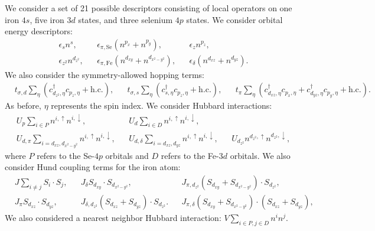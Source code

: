 We consider a set of 21 possible descriptors consisting of local operators on one iron $4s$, five iron $3d$ states, and three selenium $4p$ states.
We consider orbital energy descriptors: 
\begin{align*}
  &\epsilon_{s} n^s,&
  &\epsilon_{\pi,\mathrm{Se}} (n^{p_x} + n^{p_y}), &
  &\epsilon_{z} n^{p_z},&
  \\
  &\epsilon_{z^2} n^{d_{z^2}},& 
  &\epsilon_{\pi,\mathrm{Fe}} (n^{d_{xy}} + n^{d_{x^2-y^2}}),&
  &\epsilon_{\delta} (n^{d_{xz}} + n^{d_{yz}}).& 
\end{align*}
We also consider the symmetry-allowed hopping terms:
\begin{align*}
  &t_{\sigma,d} \sum_{\eta} \left( c_{d_{z^2},\eta}^{\dagger} c_{p_z,\eta} + \text{h.c.} \right),&
  &t_{\sigma,s} \sum_{\eta} \left(c_{s,\eta}^{\dagger}  c_{p_z,\eta} + \text{h.c.} \right),&
  &t_{\pi} \sum_{\eta} \left(c_{d_{xz},\eta}^{\dagger}  c_{p_x,\eta} + c_{d_{yz},\eta}^{\dagger}  c_{p_y,\eta} + \text{h.c.} \right).&
\end{align*}
As before, $\eta$ represents the spin index.
We consider Hubbard interactions:
\begin{align*}
  &U_p \sum_{i \in P} n^{i,\uparrow} n^{i,\downarrow},&
  &U_d \sum_{i \in D} n^{i,\uparrow} n^{i,\downarrow},&
  \\
  &U_{d,\pi} \sum_{i=d_{xz},d_{x^2-y^2}} n^{i,\uparrow} n^{i,\downarrow},&
  &U_{d,\delta} \sum_{i=d_{xz},d_{yz}} n^{i,\uparrow} n^{i,\downarrow},&
  &U_{d_{z^2}} n^{d_{z^2},\uparrow} n^{d_{z^2},\downarrow},&
\end{align*}
where $P$ refers to the Se-$4p$ orbitals and $D$ refers to the Fe-$3d$ orbitals. 
We also consider Hund coupling terms for the iron atom:
\begin{align*}
  &J \sum_{i\ne j} S_i \cdot S_j,&
  &J_{\delta} S_{d_{xy}} \cdot S_{d_{x^2-y^2}},&
  &J_{\pi,d_{z^2}} (S_{d_{xy}} + S_{d_{x^2-y^2}}) \cdot S_{d_{z^2}},&
  \\
  &J_{\pi} S_{d_{xz}} \cdot S_{d_{yz}},&
  &J_{\delta,d_{z^2}} (S_{d_{xz}} + S_{d_{yz}}) \cdot S_{d_{z^2}}.&
  &J_{\pi,\delta} (S_{d_{xy}} + S_{d_{x^2-y^2}}) \cdot (S_{d_{xz}} + S_{d_{yz}}),&
\end{align*}
We also considered a nearest neighbor Hubbard interaction: $V \sum_{i\in P, j\in D} n^{i} n^j$.

